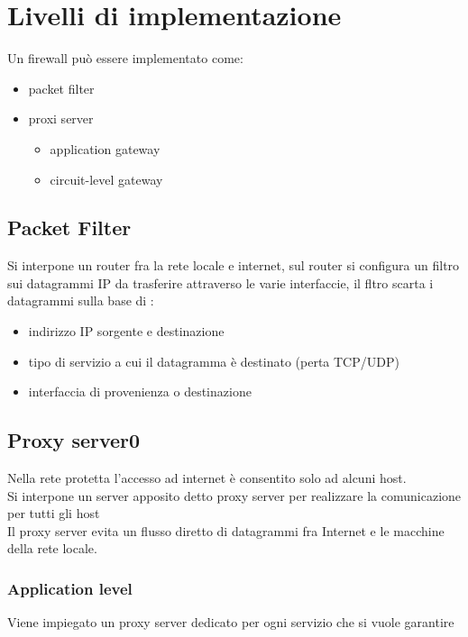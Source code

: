 \documentclass{report}
\begin{document}
        \section{Livelli di implementazione}
            Un firewall può essere implementato come: 
            \begin{itemize}
                \item packet filter 
                \item proxi server
                \begin{itemize}
                    \item application gateway
                    \item circuit-level gateway
                \end{itemize}
            \end{itemize}
            \subsection{Packet Filter}
                Si interpone un router fra la rete locale e internet, sul router si configura un filtro sui datagrammi IP da trasferire attraverso le varie interfaccie, il fltro scarta i datagrammi sulla base di :
                \begin{itemize}
                    \item indirizzo IP sorgente e destinazione
                    \item tipo di servizio a cui il datagramma è destinato (perta TCP/UDP)
                    \item interfaccia di provenienza o destinazione
                \end{itemize}
            \subsection{Proxy server0}
                Nella rete protetta l'accesso ad internet è consentito solo ad alcuni host.
                \\
                Si interpone un server apposito detto proxy server per realizzare la comunicazione per tutti gli host
                \\
                Il proxy server evita un flusso diretto di datagrammi fra Internet e le macchine della rete locale.
                \\
                \subsubsection{Application level}
                    Viene impiegato un proxy server dedicato per ogni servizio che si vuole garantire
\end{document}
